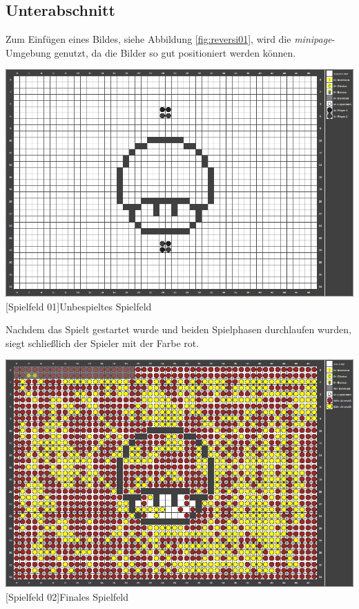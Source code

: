 \documentclass[12pt,a4paper,bibliography=totocnumbered,listof=totocnumbered]{scrartcl}
\begin{document}
    \subsection{Unterabschnitt}
    Zum Einfügen eines Bildes, siehe Abbildung \ref{fig:reversi01}, wird die \textit{minipage}-Umgebung genutzt, da die Bilder so gut positioniert werden können.

    \vspace{1em}
    \begin{minipage}{\linewidth}
        \centering
        \includegraphics[width=0.6\linewidth]{pics/gamefield01.png}
        [Spielfeld 01]{Unbespieltes Spielfeld\footnotemark }
        \label{fig:reversi01}
    \end{minipage}

    Nachdem das Spielt gestartet wurde und beiden Spielphasen durchlaufen wurden, siegt schließlich der Spieler mit der Farbe rot.

    \vspace{1em}
    \begin{minipage}{\linewidth}
        \centering
        \includegraphics[width=0.6\linewidth]{pics/gamefield02.png}
        [Spielfeld 02]{Finales Spielfeld\footnotemark }
        \label{fig:reversi2}
    \end{minipage}
    
\end{document}
